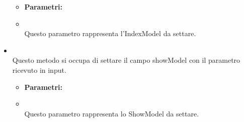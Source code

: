 \begin{itemize}
\begin{itemize}
\item[] \textbf{Parametri:}
\item[]  \\ Questo parametro rappresenta l'IndexModel da settare.
\end{itemize}
\item[] \textbf{} \\ Questo metodo si occupa di settare il campo showModel con il parametro ricevuto in input.
\begin{itemize}\addtolength{\itemsep}{-0.5\baselineskip}
\item[] \textbf{Parametri:}
\item[]  \\ Questo parametro rappresenta lo ShowModel da settare.
\end{itemize}
\end{itemize}

